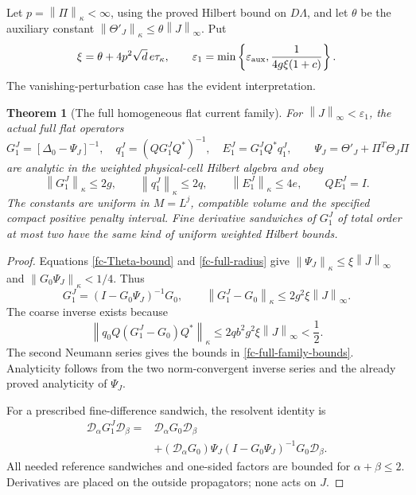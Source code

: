 \documentclass[11pt]{article}
\newtheorem{theorem}{Theorem}[section]
\theoremstyle{remark}
\newcommand{\norm}[1]{\left\|#1\right\|}
\begin{document}
Let $p=\norm{\Pi}_\kappa<\infty$, using the proved Hilbert bound
on $D\Lambda$, and let $\theta$ be the auxiliary constant
$\norm{\Theta'_J}_\kappa\le\theta\norm{J}_\infty$. Put
\begin{equation}
 \xi=\theta+4p^2\sqrt d\,e\tau_\kappa,
 \qquad
 \varepsilon_1=\min\left\{\varepsilon_{\rm aux},
              \frac1{4g\xi(1+c)}\right\}.
 \label{fc-full-radius}
\end{equation}
The vanishing-perturbation case has the evident interpretation.

\begin{theorem}[The full homogeneous flat current family]
\label{fc-full-family-theorem}
For $\norm{J}_\infty<\varepsilon_1$, the actual full flat operators
\begin{equation}
 G_1^J=[\Delta_0-\Psi_J]^{-1},\quad
 q_1^J=(QG_1^JQ^*)^{-1},\quad E_1^J=G_1^JQ^*q_1^J,
 \qquad \Psi_J=\Theta'_J+\Pi^T\Theta_J\Pi
 \label{fc-full-family}
\end{equation}
are analytic in the weighted physical-cell Hilbert algebra and obey
\begin{equation}
 \norm{G_1^J}_\kappa\le2g,\qquad
 \norm{q_1^J}_\kappa\le2q,\qquad
 \norm{E_1^J}_\kappa\le4e,
 \qquad QE_1^J=I.
 \label{fc-full-family-bounds}
\end{equation}
The constants are uniform in $M=L^j$, compatible volume and the
specified compact positive penalty interval. Fine derivative
sandwiches of $G_1^J$ of total order at most two have the same kind
of uniform weighted Hilbert bounds.
\end{theorem}

\begin{proof}
Equations \eqref{fc-Theta-bound} and \eqref{fc-full-radius} give
$\norm{\Psi_J}_\kappa\le\xi\norm{J}_\infty$ and
$\norm{G_0\Psi_J}_\kappa<1/4$. Thus
\[
 G_1^J=(I-G_0\Psi_J)^{-1}G_0,
 \qquad
 \norm{G_1^J-G_0}_\kappa\le2g^2\xi\norm{J}_\infty.
\]
The coarse inverse exists because
\[
 \norm{q_0 Q(G_1^J-G_0)Q^*}_\kappa
 \le2qb^2g^2\xi\norm{J}_\infty<\frac12.
\]
The second Neumann series gives the bounds in
\eqref{fc-full-family-bounds}. Analyticity follows from the two
norm-convergent inverse series and the already proved analyticity
of $\Psi_J$.

For a prescribed fine-difference sandwich, the resolvent identity is
\[
 \begin{split}
 \mathcal D_\alpha G_1^J\mathcal D_\beta
 ={}&\mathcal D_\alpha G_0\mathcal D_\beta\\
 &+(\mathcal D_\alpha G_0)\Psi_J
       (I-G_0\Psi_J)^{-1}G_0\mathcal D_\beta.
 \end{split}
\]
All needed reference sandwiches and one-sided factors are bounded
for $\alpha+\beta\le2$. Derivatives are placed on the outside
propagators; none acts on $J$.
\end{proof}
\end{document}
